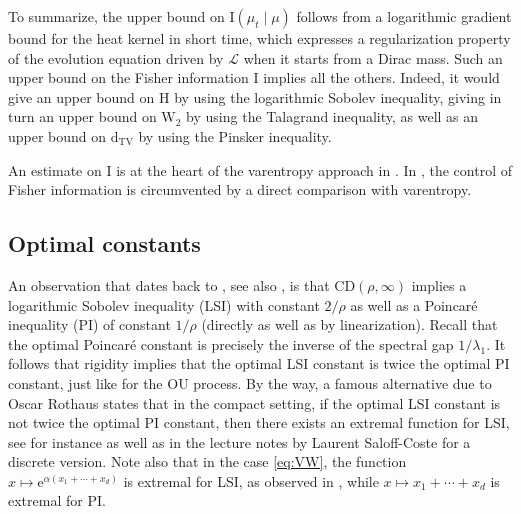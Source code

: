 \documentclass[10pt,reqno]{amsart}
\numberwithin{equation}{section}
\begin{document}
To summarize, the upper bound on $\mathrm{I}(\mu_{t}\mid\mu)$ follows from a
logarithmic gradient bound for the heat kernel in short time, which expresses
a regularization property of the evolution equation driven by $\mathcal{L}$ when it
starts from a Dirac mass. Such an upper bound on the Fisher information
$\mathrm{I}$ implies all the others. Indeed, it would give an upper bound on
$\mathrm{H}$ by using the logarithmic Sobolev inequality, giving in turn an
upper bound on $\mathrm{W}_2$ by using the Talagrand inequality, as well as an
upper bound on $\mathrm{d}_{\mathrm{TV}}$ by using the Pinsker inequality.

An estimate on $\mathrm{I}$ is at the heart of the varentropy approach in
\cite{Salez24}. In \cite{salez-2025}, the control of Fisher information is
circumvented by a direct comparison with varentropy.


\subsection{Optimal constants}

An observation that dates back to \cite{BE85}, see also \cite{BGL14}, is that $\mathrm{CD}(\rho,\infty)$ implies a
logarithmic Sobolev inequality (LSI) with constant $2/\rho$ as well as a
Poincaré inequality (PI) of constant $1/\rho$ (directly as well as by
linearization). Recall that the optimal Poincaré constant is precisely the
inverse of the spectral gap $1/\lambda_1$. It follows that rigidity implies
that the optimal LSI constant is twice the optimal PI constant, just like for
the OU process. By the way, a famous alternative due to Oscar Rothaus states
that in the compact setting, if the optimal LSI constant is not twice the
optimal PI constant, then there exists an extremal function for LSI, see for
instance \cite[Th.~at bottom of p.~107]{MR620581} as well as
\cite[Th.~2.2.3 p.~333]{MR1490046} in the lecture notes by Laurent
Saloff-Coste for a discrete version. Note also that in the case \eqref{eq:VW},
the function $x\mapsto\mathrm{e}^{\alpha(x_1+\cdots+x_d)}$ is extremal for
LSI, as observed in \cite{MR4175749}, while $x\mapsto x_1+\cdots+x_d$ is
extremal for PI.
\end{document}
